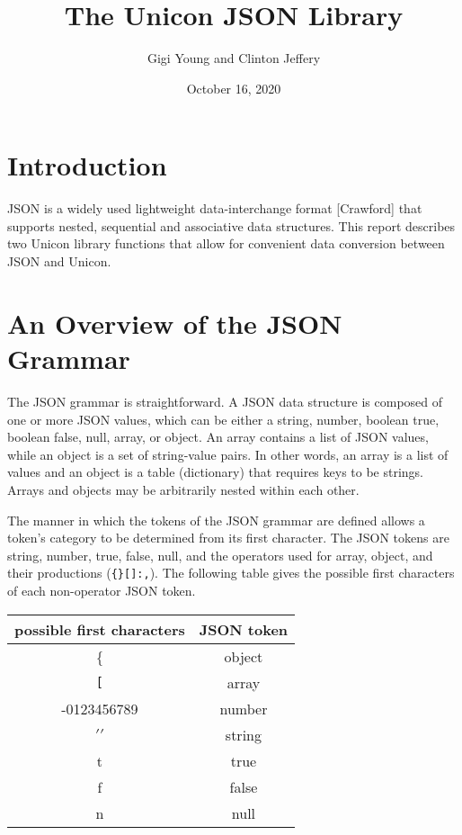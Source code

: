 \documentclass[letterpaper,12pt]{article}
\title{The Unicon JSON Library}
\author{Gigi Young and Clinton Jeffery}
\date{October 16, 2020}
\begin{document}
\maketitle

\section{Introduction}

JSON is a widely used lightweight data-interchange format [Crawford]
that supports nested, sequential and associative data structures.
This report describes two Unicon library
functions that allow for convenient data conversion
between JSON and Unicon.

\section{An Overview of the JSON Grammar}

The JSON grammar is straightforward. A JSON data structure is composed
of one or more JSON values, which can be either a string, number,
boolean true, boolean false, null, array, or object. An array contains
a list of JSON values, while an object is a set of string-value
pairs. In other words, an array is a list of values and an object is a
table (dictionary) that requires keys to be strings.
Arrays and objects may be arbitrarily nested within each other.

The manner in which the tokens of the JSON grammar are defined allows
a token's category to be determined from its first character. The JSON
tokens are string, number, true, false, null, and the operators used
for array, object, and their productions (\texttt{\{\}[]:,}). The
following table gives the possible first characters of each
non-operator JSON token.

\begin{center}
\begin{tabular}{ c | c }
 possible first characters  & JSON token \\
 \hline
 \{                         & object \\
 \verb"["                   & array \\
 -0123456789                & number \\
 $\prime\prime$             & string \\
 t                          & true \\
 f                          & false \\
 n                          & null \\

\end{tabular}
\end{center}
\end{document}
